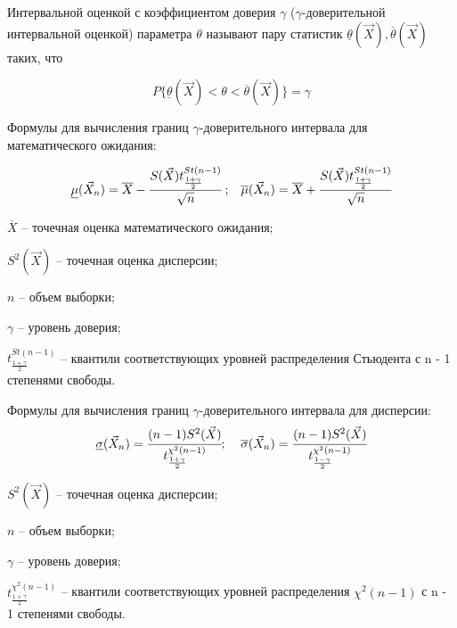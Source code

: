\begin{definition}
Интервальной оценкой с коэффициентом доверия $\gamma$ ($\gamma$-доверительной интервальной оценкой) параметра $\theta$ называют пару статистик $\underline{\theta}(\vec X), \overline{\theta}(\vec X)$ таких, что

$$P\{\underline{\theta}(\vec X)< \theta< \overline{\theta}(\vec X)\}=\gamma$$ 
\end{definition}

Формулы для вычисления границ $\gamma$-доверительного интервала для математического ожидания:

\begin{equation}
	\begin{array}{cc}
		\underline\mu(\vec X_n)=\overline X - \cfrac{S(\vec X)t^{St(n-1)}_{\frac{1+\gamma}{2}}}{\sqrt{n}}\; ; & \overline\mu(\vec X_n)=\overline X + \cfrac{S(\vec X)t^{St(n-1)}_{\frac{1+\gamma}{2}}}{\sqrt{n}}
	\end{array}
\end{equation}

$\overline X$ -- точечная оценка математического ожидания;

$S^2(\vec X)$ -- точечная оценка дисперсии;

$n$ -- объем выборки;

$\gamma$ -- уровень доверия;

$t^{St(n-1)}_{\frac{1+\gamma}{2}}$ -- квантили соответствующих уровней распределения Стьюдента с n - 1 степенями свободы.

Формулы для вычисления границ $\gamma$-доверительного интервала для дисперсии:
\begin{equation}
	\begin{array}{cc}
		\underline\sigma(\vec X_n)= \cfrac{(n-1)S^2(\vec X)}{t^{\chi^2(n-1)}_{\frac{1+\gamma}{2}}};\; & \overline\sigma(\vec X_n)= \cfrac{(n-1)S^2(\vec X)}{t^{\chi^2(n-1)}_{\frac{1-\gamma}{2}}}
	\end{array}
\end{equation}

$S^2(\vec X)$ -- точечная оценка дисперсии;

$n$ -- объем выборки;

$\gamma$ -- уровень доверия;

$t^{\chi^2(n-1)}_{\frac{1+\gamma}{2}}$ -- квантили соответствующих уровней распределения $\chi^2(n-1)$ с n - 1 степенями свободы.


